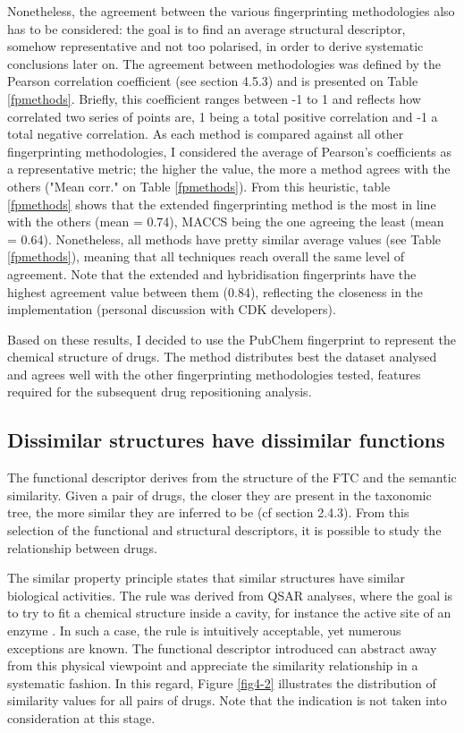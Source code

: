 Nonetheless, the agreement between the various fingerprinting methodologies also has to be considered: the goal is to find an average structural descriptor, somehow representative and not too polarised, in order to derive systematic conclusions later on. The agreement between methodologies was defined by the Pearson correlation coefficient (see section 4.5.3) and is presented on Table \ref{fpmethods}. Briefly, this coefficient ranges between -1 to 1 and reflects how correlated two series of points are, 1 being a total positive correlation and -1 a total negative correlation. As each method is compared against all other fingerprinting methodologies, I considered the average of Pearson's coefficients as a representative metric; the higher the value, the more a method agrees with the others ("Mean corr." on Table \ref{fpmethods}). From this heuristic, table \ref{fpmethods} shows that the extended fingerprinting method is the most in line with the others (mean = 0.74), MACCS being the one agreeing the least (mean = 0.64). Nonetheless, all methods have pretty similar average values (see Table \ref{fpmethods}), meaning that all techniques reach overall the same level of agreement. Note that the extended and hybridisation fingerprints have the highest agreement value between them (0.84), reflecting the closeness in the implementation (personal discussion with CDK developers).

Based on these results, I decided to use the PubChem fingerprint to represent the chemical structure of drugs. The method distributes best the dataset analysed and agrees well with the other fingerprinting methodologies tested, features required for the subsequent drug repositioning analysis.

\subsection{Dissimilar structures have dissimilar functions}
The functional descriptor derives from the structure of the FTC and the semantic similarity. Given a pair of drugs, the closer they are present in the taxonomic tree, the more similar they are inferred to be (cf section 2.4.3). From this selection of the functional and structural descriptors, it is possible to study the relationship between drugs.

The similar property principle states that similar structures have similar biological activities. The rule was derived from QSAR analyses, where the goal is to try to fit a chemical structure inside a cavity, for instance the active site of an enzyme \citep{todeschini2009molecular}. In such a case, the rule is intuitively acceptable, yet numerous exceptions are known. The functional descriptor introduced can abstract away from this physical viewpoint and appreciate the similarity relationship in a systematic fashion. In this regard, Figure \ref{fig4-2} illustrates the distribution of similarity values for all pairs of drugs. Note that the indication is not taken into consideration at this stage.

